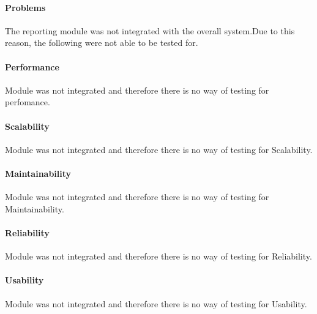 
\paragraph{Problems}
The reporting module was not integrated with the overall system.Due to this reason,
the following were not able to be tested for.

\paragraph{Performance}
	Module was not integrated and therefore there is no way of testing for perfomance.
	
\paragraph{Scalability}
	Module was not integrated and therefore there is no way of testing for Scalability.

\paragraph{Maintainability}
	Module was not integrated and therefore there is no way of testing for Maintainability.
		
\paragraph{Reliability}
	Module was not integrated and therefore there is no way of testing for Reliability.
		
\paragraph{Usability}
	Module was not integrated and therefore there is no way of testing for Usability.
	
